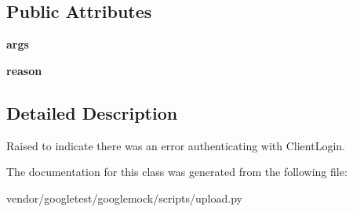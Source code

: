 \subsection*{Public Attributes}
\begin{DoxyCompactItemize}
\item 
{\bfseries args}\hypertarget{classupload_1_1ClientLoginError_ac300a0b034b2bc64cedc51e09fb6d663}{}\label{classupload_1_1ClientLoginError_ac300a0b034b2bc64cedc51e09fb6d663}

\item 
{\bfseries reason}\hypertarget{classupload_1_1ClientLoginError_ae0555feb182d89d1e4d7944afbfe14e5}{}\label{classupload_1_1ClientLoginError_ae0555feb182d89d1e4d7944afbfe14e5}

\end{DoxyCompactItemize}


\subsection{Detailed Description}
\begin{DoxyVerb}Raised to indicate there was an error authenticating with ClientLogin.\end{DoxyVerb}
 

The documentation for this class was generated from the following file\+:\begin{DoxyCompactItemize}
\item 
vendor/googletest/googlemock/scripts/upload.\+py\end{DoxyCompactItemize}
